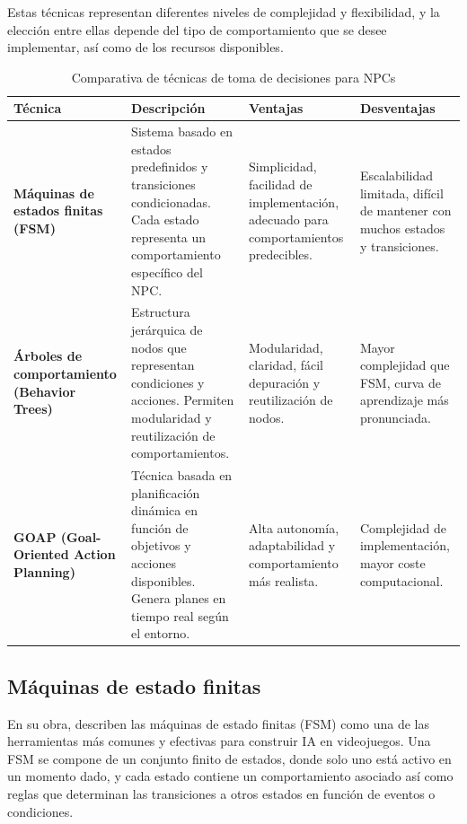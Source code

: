 Estas técnicas representan diferentes niveles de complejidad y flexibilidad, y la elección entre ellas depende del tipo de comportamiento que se desee implementar, así como de los recursos disponibles. 

\begin{table}[htbp]
\centering
\caption{Comparativa de técnicas de toma de decisiones para NPCs}
\begin{tabularx}{\textwidth}{|X|X|X|X|}
\hline
\textbf{Técnica} & \textbf{Descripción} & \textbf{Ventajas} & \textbf{Desventajas} \\
\hline
\textbf{Máquinas de estados finitas (FSM)} & Sistema basado en estados predefinidos y transiciones condicionadas. Cada estado representa un comportamiento específico del NPC. & Simplicidad, facilidad de implementación, adecuado para comportamientos predecibles. & Escalabilidad limitada, difícil de mantener con muchos estados y transiciones. \\
\hline
\textbf{Árboles de comportamiento (Behavior Trees)} & Estructura jerárquica de nodos que representan condiciones y acciones. Permiten modularidad y reutilización de comportamientos. & Modularidad, claridad, fácil depuración y reutilización de nodos. & Mayor complejidad que FSM, curva de aprendizaje más pronunciada. \\
\hline
\textbf{GOAP (Goal-Oriented Action Planning)} & Técnica basada en planificación dinámica en función de objetivos y acciones disponibles. Genera planes en tiempo real según el entorno. & Alta autonomía, adaptabilidad y comportamiento más realista. & Complejidad de implementación, mayor coste computacional. \\
\hline
\end{tabularx}
\label{tab:ComparativaTecnicas_NPCs}
\end{table}

\subsection{Máquinas de estado finitas}
En su obra, \cite{MillingtonFunge2016} describen las máquinas de estado finitas (FSM) como una de las herramientas más comunes y efectivas para construir IA en videojuegos. Una FSM se compone de un conjunto finito de estados, donde solo uno está activo en un momento dado, y cada estado contiene un comportamiento asociado así como reglas que determinan las transiciones a otros estados en función de eventos o condiciones.\\


